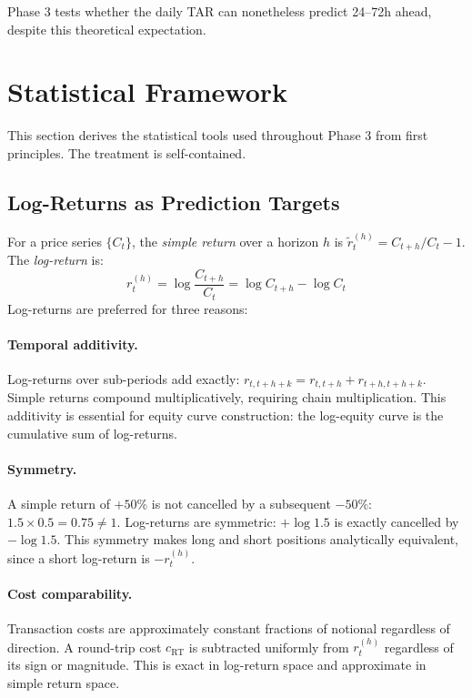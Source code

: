 \documentclass[12pt, a4paper]{article}
\theoremstyle{plain}
\theoremstyle{definition}
\begin{document}
Phase 3 tests whether the daily TAR can nonetheless predict 24--72h
ahead, despite this theoretical expectation.

\section{Statistical Framework}
\label{sec:stats}

This section derives the statistical tools used throughout Phase 3 from
first principles.  The treatment is self-contained.

\subsection{Log-Returns as Prediction Targets}

For a price series $\{C_t\}$, the \emph{simple return} over a horizon $h$ is
$\tilde{r}_t^{(h)} = C_{t+h}/C_t - 1$.  The \emph{log-return} is:
\[
  r_t^{(h)} = \log\frac{C_{t+h}}{C_t} = \log C_{t+h} - \log C_t
\]
Log-returns are preferred for three reasons:

\paragraph{Temporal additivity.}
Log-returns over sub-periods add exactly: $r_{t,t+h+k} = r_{t,t+h} + r_{t+h,t+h+k}$.
Simple returns compound multiplicatively, requiring chain multiplication.
This additivity is essential for equity curve construction: the log-equity
curve is the cumulative sum of log-returns.

\paragraph{Symmetry.}
A simple return of $+50\%$ is not cancelled by a subsequent $-50\%$:
$1.5 \times 0.5 = 0.75 \neq 1$.  Log-returns are symmetric: $+\log 1.5$
is exactly cancelled by $-\log 1.5$.  This symmetry makes long and short
positions analytically equivalent, since a short log-return is $-r_t^{(h)}$.

\paragraph{Cost comparability.}
Transaction costs are approximately constant fractions of notional regardless
of direction.  A round-trip cost $c_{\text{RT}}$ is subtracted uniformly from
$r_t^{(h)}$ regardless of its sign or magnitude.  This is exact in log-return
space and approximate in simple return space.
\end{document}
